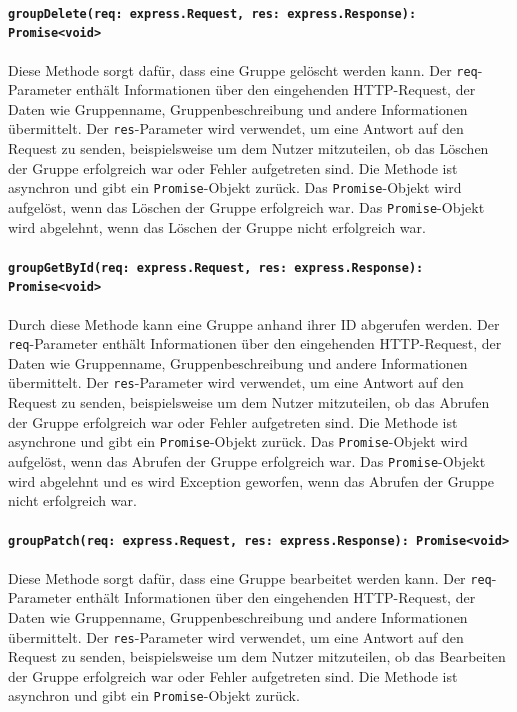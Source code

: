 \documentclass{entwurfsheft}
\begin{document}
\begin{sloppypar}
\paragraph{\texttt{groupDelete(req: express.Request, res: express.Response): Promise<void>\\}}
Diese Methode sorgt dafür, dass eine Gruppe gelöscht werden kann. Der \texttt{req}-Parameter enthält Informationen über den eingehenden HTTP-Request, der Daten wie Gruppenname, Gruppenbeschreibung und andere Informationen übermittelt. Der \texttt{res}-Parameter wird verwendet, um eine Antwort auf den Request zu senden, beispielsweise um dem Nutzer mitzuteilen, ob das Löschen der Gruppe erfolgreich war oder Fehler aufgetreten sind.
Die Methode ist asynchron und gibt ein \texttt{Promise}-Objekt zurück. Das \texttt{Promise}-Objekt wird aufgelöst, wenn das Löschen der Gruppe erfolgreich war. Das \texttt{Promise}-Objekt wird abgelehnt, wenn das Löschen der Gruppe nicht erfolgreich war.

\paragraph{\texttt{groupGetById(req: express.Request, res: express.Response): Promise<void>\\}}
Durch diese Methode kann eine Gruppe anhand ihrer ID abgerufen werden. Der \texttt{req}-Parameter enthält Informationen über den eingehenden HTTP-Request, der Daten wie Gruppenname, Gruppenbeschreibung und andere Informationen übermittelt. Der \texttt{res}-Parameter wird verwendet, um eine Antwort auf den Request zu senden, beispielsweise um dem Nutzer mitzuteilen, ob das Abrufen der Gruppe erfolgreich war oder Fehler aufgetreten sind.
Die Methode ist asynchrone und gibt ein \texttt{Promise}-Objekt zurück. Das \texttt{Promise}-Objekt wird aufgelöst, wenn das Abrufen der Gruppe erfolgreich war. Das \texttt{Promise}-Objekt wird abgelehnt und es wird Exception geworfen, wenn das Abrufen der Gruppe nicht erfolgreich war.
\paragraph{\texttt{groupPatch(req: express.Request, res: express.Response): Promise<void>\\}}
Diese Methode sorgt dafür, dass eine Gruppe bearbeitet werden kann. Der \texttt{req}-Parameter enthält Informationen über den eingehenden HTTP-Request, der Daten wie Gruppenname, Gruppenbeschreibung und andere Informationen übermittelt. Der \texttt{res}-Parameter wird verwendet, um eine Antwort auf den Request zu senden, beispielsweise um dem Nutzer mitzuteilen, ob das Bearbeiten der Gruppe erfolgreich war oder Fehler aufgetreten sind.
Die Methode ist asynchron und gibt ein \texttt{Promise}-Objekt zurück.

\end{sloppypar}
\end{document}
